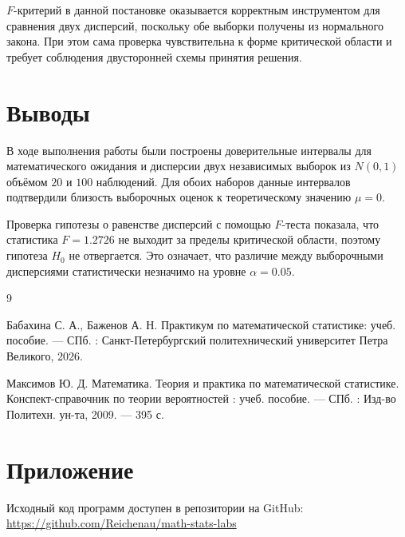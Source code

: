 \documentclass[a4paper, 14pt]{extarticle}
\begin{document}
$F$-критерий в данной постановке оказывается корректным инструментом для сравнения двух дисперсий, поскольку обе выборки получены из нормального закона. При этом сама проверка чувствительна к форме критической области и требует соблюдения двусторонней схемы принятия решения.

\section{Выводы}

В ходе выполнения работы были построены доверительные интервалы для математического ожидания и дисперсии двух независимых выборок из $N(0,1)$ объёмом $20$ и $100$ наблюдений. Для обоих наборов данные интервалов подтвердили близость выборочных оценок к теоретическому значению $\mu = 0$.

Проверка гипотезы о равенстве дисперсий с помощью $F$-теста показала, что статистика $F = 1.2726$ не выходит за пределы критической области, поэтому гипотеза $H_0$ не отвергается. Это означает, что различие между выборочными дисперсиями статистически незначимо на уровне $\alpha = 0.05$.

\renewcommand{\refname}{\thesection\ Список литературы}

\begin{thebibliography}{9}

    Бабахина С. А., Баженов А. Н. Практикум по математической статистике: учеб. пособие. — СПб. : Санкт-Петербургский политехнический университет Петра Великого, 2026. 

    Максимов Ю. Д. Математика. Теория и практика по математической статистике. Конспект-справочник по теории вероятностей : учеб. пособие. — СПб. : Изд-во Политехн. ун-та, 2009. — 395 с. 

\end{thebibliography}

\section{Приложение}
Исходный код программ доступен в репозитории на GitHub: \\
\url{https://github.com/Reichenau/math-stats-labs}
 
\end{document}
